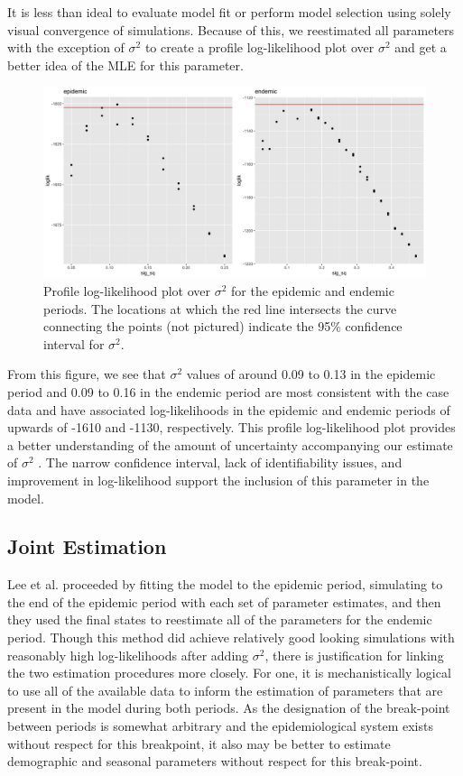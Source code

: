 \documentclass[12pt]{article}
\begin{document}
 It is less than ideal to evaluate model fit or perform model selection using solely visual convergence of simulations. Because of this, we reestimated all parameters with the exception of $\sigma^2$ to create a profile log-likelihood plot over $\sigma^2$ and get a better idea of the MLE for this parameter.
        \begin{figure}[H]
          \centering
          \includegraphics[width=150mm]{prof_lik_plot.png}
          \caption{Profile log-likelihood plot over $\sigma^2$ for the epidemic and endemic periods. The locations at which the red line intersects the curve connecting the points (not pictured) indicate the 95\% confidence interval for $\sigma^2$.}
          \label{fig:3}
        \end{figure}

  From this figure, we see that $\sigma^2$ values of around 0.09 to 0.13 in the epidemic period and 0.09 to 0.16 in the endemic period are most consistent with the case data and have associated log-likelihoods in the epidemic and endemic periods of upwards of -1610 and -1130, respectively. This profile log-likelihood plot provides a better understanding of the amount of uncertainty accompanying our estimate of $\sigma^2$ \cite{Cole}. The narrow confidence interval, lack of identifiability issues, and improvement in log-likelihood support the inclusion of this parameter in the model. 

\subsection{Joint Estimation}

  Lee et al. proceeded by fitting the model to the epidemic period, simulating to the end of the epidemic period with each set of parameter estimates, and then they used the final states to reestimate all of the parameters for the endemic period. Though this method did achieve relatively good looking simulations with reasonably high log-likelihoods after adding $\sigma^2$, there is justification for linking the two estimation procedures more closely. For one, it is mechanistically logical to use all of the available data to inform the estimation of parameters that are present in the model during both periods. As the designation of the break-point between periods is somewhat arbitrary and the epidemiological system exists without respect for this breakpoint, it also may be better to estimate demographic and seasonal parameters without respect for this break-point.
  
\end{document}

